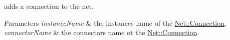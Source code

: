 adds a connection to the net. 


\begin{DoxyParams}{Parameters}
{\em instance\+Name} & the instance\textquotesingle{}s name of the \mbox{\hyperlink{class_open_chams_1_1_net_1_1_connection}{Net\+::\+Connection}}. \\
\hline
{\em connector\+Name} & the connector\textquotesingle{}s name ot the \mbox{\hyperlink{class_open_chams_1_1_net_1_1_connection}{Net\+::\+Connection}}. \\
\hline
\end{DoxyParams}
